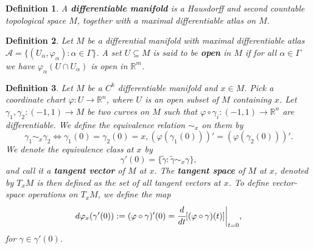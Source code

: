 \documentclass[12pt]{article}
\newcommand{\real}{\mathbb{R}}
\newcommand\set[1]{\{#1\}}
\newcommand{\res}[2]{#1\bigg\rvert_{#2}}
\newtheorem{defn}{Definition}[thm]
\begin{document}
\begin{defn}
  A \textbf{differentiable manifold} is a Hausdorff and  second countable topological space  $M$, together  with a maximal differentiable  atlas on $M$.
\end{defn}

\begin{defn}
  Let $M$ be a differential manifold with maximal differentiable atlas $ \mathcal{A} = \set{(U_{\alpha}, \varphi_{\alpha}): \alpha \in \Gamma}$. A set $U \subseteq M$ is said to be \textbf{open} in $M$ if for all $\alpha \in \Gamma$ we have $\varphi_{\alpha}(U \cap U_{\alpha})$ is open in $\real^m$.
\end{defn}
\begin{defn}
  Let $M$ be a $C^k$ differentiable manifold and $x \in M$. Pick a coordinate chart $\varphi : U \to \real^n$, where $U$ is an open subset of $M$ containing $x$. Let $\gamma_1, \gamma_2 : (-1,1) \to M$ be two curves on $M$ such that  $\varphi \circ \gamma_i: (-1,1) \to \real^n$ are differentiable. We define the equivalence relation $ \sim_x $ on them by
  \begin{equation*}
    \gamma_1 \sim_x \gamma_2 \iff \gamma_1(0) = \gamma_2(0) = x, (\varphi (\gamma_1(0)))' = (\varphi (\gamma_2 (0)))'.
  \end{equation*}
  We  denote the equivalence class at $x$ by 
  \begin{equation*}
    \gamma'(0)= \set{\widetilde{\gamma} : \widetilde{\gamma} \sim_x \gamma},
  \end{equation*}
  and  call it a \textbf{tangent vector} of $M$ at $x$. The \textbf{tangent space}  of  $M$ at $x$,  denoted by $T_xM$ is then defined as the set  of all tangent vectors  at $x$. To define vector-space operations on $T_xM$, we define the map
  \begin{equation*}
    d\varphi_x(\gamma'(0)) := (\varphi \circ \gamma)'(0) = \res{\cfrac{d}{dt}[(\varphi \circ \gamma)(t)]}{t=0},
  \end{equation*}
  for $ \gamma \in \gamma'(0)$.
\end{defn}
\end{document}
